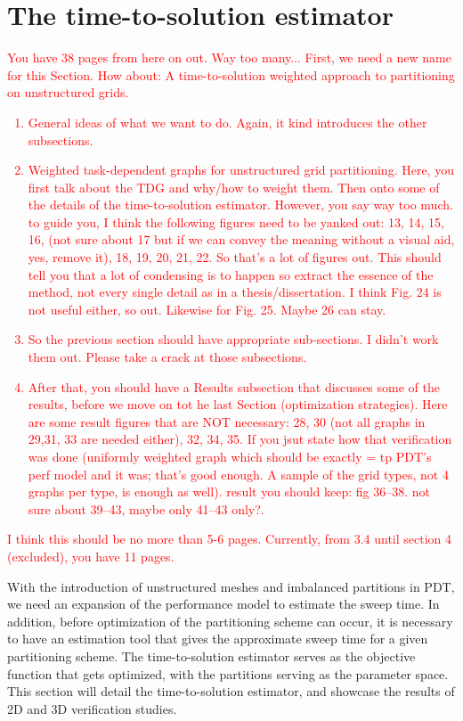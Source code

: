 \documentclass[times,final]{elsarticle}
\newcommand{\tcr}[1]{\textcolor{red}{#1}}
\begin{document}
\section{The time-to-solution estimator}\label{cha:tts}
\tcr{You have 38 pages from here on out. Way too many... First, we need a new name for this Section. How about: A time-to-solution weighted approach to partitioning on unstructured grids.
\begin{enumerate}
\item General ideas of what we want to do. Again, it kind introduces the other subsections.
\item Weighted task-dependent graphs for unstructured grid partitioning. Here, you first talk about the TDG and why/how to weight them. Then onto some of the details of the time-to-solution estimator. However, you say way too much. to guide you, I think the following figures need to be yanked out: 13, 14, 15, 16, (not sure about 17 but if we can convey the meaning without a visual aid, yes, remove it), 18, 19, 20, 21, 22. So that's a lot of figures out. This should tell you that a lot of condensing is to happen so extract the essence of the method, not every single detail as in a thesis/dissertation. I think Fig. 24 is not useful either, so out. Likewise for Fig. 25. Maybe 26 can stay. 
\item So the previous section should have appropriate sub-sections. I didn't work them out. Please take a crack at those subsections.
\item After that, you should have a Results subsection that discusses some of the results, before we move on tot he last Section (optimization strategies). Here are some result figures that are NOT necessary: 28, 30 (not all graphs in 29,31, 33 are needed either), 32, 34, 35. If you jsut state how that verification was done (uniformly weighted graph which should be exactly = tp PDT's perf model and it was; that's good enough. A sample of the grid types, not 4 graphs per type, is enough as well). result you should keep: fig 36--38. not sure about 39--43, maybe only 41--43 only?.  
\end{enumerate}
I think this should be no more than 5-6 pages. Currently, from 3.4 until section 4 (excluded), you have 11 pages.
}


With the introduction of unstructured meshes and imbalanced partitions in PDT, we need an expansion of the performance model to estimate the sweep time.
In addition, before optimization of the partitioning scheme can occur, it is necessary to have an estimation tool that gives the approximate sweep time for a given partitioning scheme.
The time-to-solution estimator serves as the objective function that gets optimized, with the partitions serving as the parameter space. This section will detail the time-to-solution estimator, and showcase the results of 2D and 3D verification studies.
\end{document}
